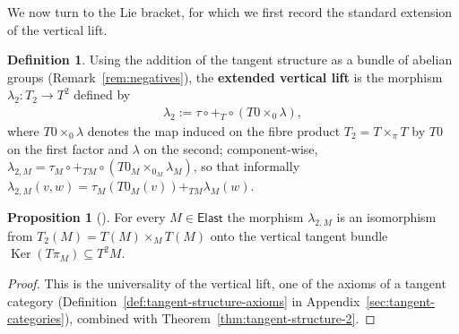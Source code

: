 \documentclass{amsart}
\DeclareMathOperator{\Ker}{Ker}
\theoremstyle{definition}
\newtheorem{defn}[thm]{Definition}
\newtheorem{prop}[thm]{Proposition}
\begin{document}
We now turn to the Lie bracket, for which we first record the standard
extension of the vertical lift.

\begin{defn}\label{def:vertical-lift-extension}
Using the addition of the tangent structure as a bundle of abelian groups
(Remark~\ref{rem:negatives}), the \textbf{extended vertical lift} is the
morphism $\lambda_2 \colon T_2 \to T^2$ defined by
\begin{align*}
    \lambda_2 := \tau \circ {+}_T \circ (T0 \times_0 \lambda),
\end{align*}
where $T0 \times_0 \lambda$ denotes the map induced on the fibre product
$T_2 = T\times_\pi T$ by $T0$ on the first factor and $\lambda$ on the second;
component-wise,
$\lambda_{2,M} = \tau_M \circ {+}_{TM} \circ (T0_M \times_{0_M} \lambda_M)$, so
that informally $\lambda_{2,M}(v,w) = \tau_M(T0_M(v)) +_{TM} \lambda_M(w)$.
\end{defn}

\begin{prop}[{\cite[Section~3.4]{CC14}}]\label{prop:lambda2-iso}
For every $M \in \mathsf{Elast}$ the morphism $\lambda_{2,M}$ is an
isomorphism from $T_2(M) = T(M) \times_M T(M)$ onto the vertical tangent bundle
$\Ker(T\pi_M) \subseteq T^2M$.
\end{prop}

\begin{proof}
This is the universality of the vertical lift, one of the axioms of a tangent
category (Definition~\ref{def:tangent-structure-axioms} in
Appendix~\ref{sec:tangent-categories}), combined with
Theorem~\ref{thm:tangent-structure-2}.
\end{proof}
\end{document}
